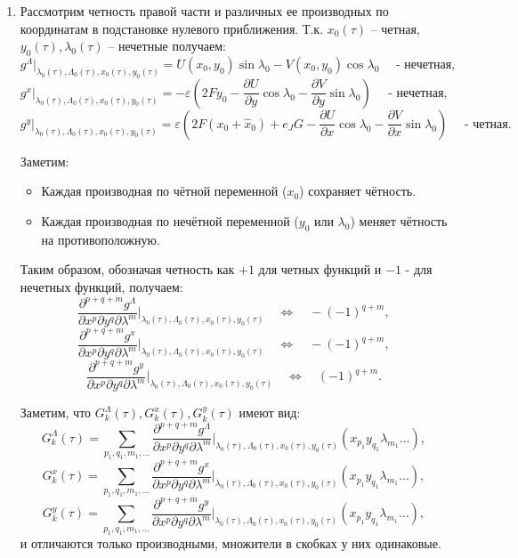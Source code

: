 \begin{enumerate}
\item Рассмотрим четность правой части и различных ее производных по координатам в подстановке нулевого приближения.
Т.к. $x_0(\tau)$ -- четная, $y_0(\tau), \lambda_0(\tau)$ -- нечетные получаем:
$$g^\Lambda|_{\lambda_0(\tau),\Lambda_0(\tau),x_0(\tau),y_0(\tau)} = U(x_0,y_0)\sin\lambda_0-V(x_0,y_0)\cos\lambda_0 \quad \text{ - нечетная},$$
$$g^x|_{\lambda_0(\tau),\Lambda_0(\tau),x_0(\tau),y_0(\tau)} = -\varepsilon \left( 2Fy_0-\frac{\partial U}{\partial y} \cos \lambda_0 - \frac{\partial V}{\partial y} \sin \lambda_0 \right) \quad \text{ - нечетная},$$
$$g^y|_{\lambda_0(\tau),\Lambda_0(\tau),x_0(\tau),y_0(\tau)} = \varepsilon \left( 2F(x_0+\hat x_0)+e_JG -\frac{\partial U}{\partial x} \cos \lambda_0 - \frac{\partial V}{\partial x} \sin \lambda_0 \right) \quad \text{ - четная}.$$

Заметим:
\begin{itemize}
    \item Каждая производная по чётной переменной ($x_0$) сохраняет чётность.
    \item Каждая производная по нечётной переменной ($y_0$ или $\lambda_0$) меняет чётность на противоположную.
\end{itemize}
Таким образом, обозначая четность как $+1$ для четных функций и  $-1$ -  для нечетных функций, получаем:
$$\frac{\partial^{p+q+m}g^\Lambda}{\partial x^p \partial y^q \partial \lambda^m}\bigg|_{\lambda_0(\tau),\Lambda_0(\tau),x_0(\tau),y_0(\tau)} \quad \Leftrightarrow \quad -(-1)^{q+m},$$
\begin{equation}
\frac{\partial^{p+q+m}g^x}{\partial x^p \partial y^q \partial \lambda^m}\bigg|_{\lambda_0(\tau),\Lambda_0(\tau),x_0(\tau),y_0(\tau)} \quad \Leftrightarrow \quad -(-1)^{q+m}, \label{chetnost}
\end{equation}
$$\frac{\partial^{p+q+m}g^y}{\partial x^p \partial y^q \partial \lambda^m}\bigg|_{\lambda_0(\tau),\Lambda_0(\tau),x_0(\tau),y_0(\tau)} \quad \Leftrightarrow \quad (-1)^{q+m}.$$

Заметим, что $G_k^\Lambda(\tau),G_k^x(\tau),G_k^y(\tau)$ имеют вид:
$$G_k^\Lambda(\tau) = \sum_{p_1,q_1,m_1,...} \frac{\partial^{p+q+m}g^\Lambda}{\partial x^p \partial y^q \partial \lambda^m}\bigg|_{\lambda_0(\tau),\Lambda_0(\tau),x_0(\tau),y_0(\tau)} (x_{p_1}y_{q_1}\lambda_{m_1}...),$$
$$G_k^x(\tau) = \sum_{p_1,q_1,m_1,...} \frac{\partial^{p+q+m}g^x}{\partial x^p \partial y^q \partial \lambda^m}\bigg|_{\lambda_0(\tau),\Lambda_0(\tau),x_0(\tau),y_0(\tau)} (x_{p_1}y_{q_1}\lambda_{m_1}...),$$
$$G_k^y(\tau) = \sum_{p_1,q_1,m_1,...} \frac{\partial^{p+q+m}g^y}{\partial x^p \partial y^q \partial \lambda^m}\bigg|_{\lambda_0(\tau),\Lambda_0(\tau),x_0(\tau),y_0(\tau)} (x_{p_1}y_{q_1}\lambda_{m_1}...),$$
и отличаются только производными, множители в скобках у них одинаковые.


\end{enumerate}
